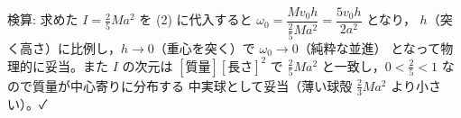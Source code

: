 \documentclass[11pt,a4paper]{article}
\begin{document}
\medskip
検算: 求めた $I=\tfrac{2}{5}Ma^2$ を (2) に代入すると
$\omega_0=\dfrac{Mv_0h}{\frac{2}{5}Ma^2}=\dfrac{5v_0h}{2a^2}$ となり，
$h$（突く高さ）に比例し，$h\to 0$（重心を突く）で $\omega_0\to 0$（純粋な並進）
となって物理的に妥当。また $I$ の次元は $[\text{質量}][\text{長さ}]^2$ で
$\tfrac{2}{5}Ma^2$ と一致し，$0<\tfrac25<1$ なので質量が中心寄りに分布する
中実球として妥当（薄い球殻 $\tfrac23 Ma^2$ より小さい）。✓
\end{document}
